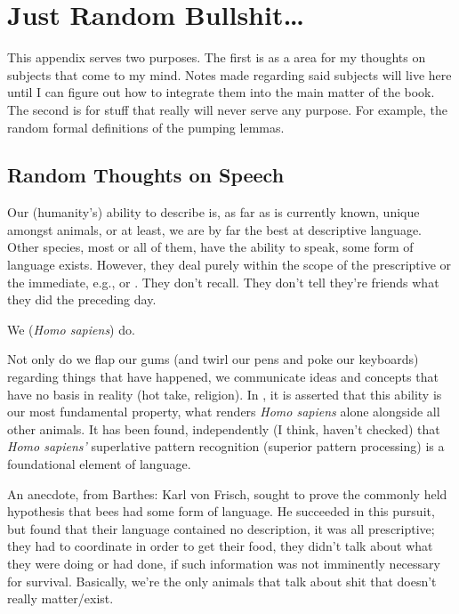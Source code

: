 \documentclass[../butidigress.tex]{subfiles}
\begin{document}
\chapter{Just Random Bullshit\dots}\label{chap:justrandom}
\newpage

This appendix serves two purposes.
The first is as a area for my thoughts on subjects that come to my mind.
Notes made regarding said subjects will live here until I can figure out how to integrate them into the main matter of the book.
The second is for stuff that really will never serve any purpose.
For example, the random formal definitions of the pumping lemmas.

\section{Random Thoughts on Speech}
Our (humanity's) ability to describe is, as far as is currently known, unique amongst animals, or at least, we are by far the best at descriptive language.
Other species, most or all of them, have the ability to speak, some form of language exists.
However, they deal purely within the scope of the prescriptive or the immediate, e.g.,  or .
They don't recall.
They don't tell they're friends what they did the preceding day.

We (\textit{Homo sapiens}) do.

Not only do we flap our gums (and twirl our pens and poke our keyboards) regarding things that have happened, we communicate ideas and concepts that have no basis in reality (hot take, religion). In , it is asserted that this ability is our most fundamental property, what renders \emph{Homo sapiens} alone alongside all other animals\autocite{sapiens}.
It has been found, independently (I think, haven't checked) that \emph{Homo sapiens'} superlative pattern recognition (superior pattern processing) is a foundational element of language.

An anecdote, from Barthes: Karl von Frisch, sought to prove the commonly held hypothesis that bees had some form of language.
He succeeded in this pursuit, but found that their language contained no description, it was all prescriptive; they had to coordinate in order to get their food, they didn't talk about what they were doing or had done, if such information was not imminently necessary for survival.
Basically, we're the only animals that talk about shit that doesn't really matter/exist.
\end{document}
